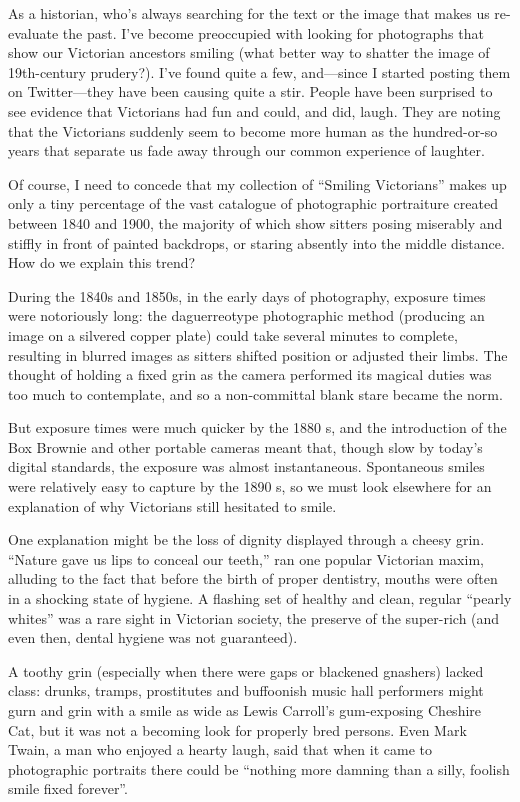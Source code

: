 As a historian, who's always searching for the text or the image that
makes us re-evaluate the past. I've become preoccupied with looking for
photographs that show our Victorian ancestors smiling (what better way
to shatter the image of 19th-century prudery?). I've found quite a few,
and---since I started posting them on Twitter---they have been causing
quite a stir. People have been surprised to see evidence that Victorians
had fun and could, and did, laugh. They are noting that the Victorians
suddenly seem to become more human as the hundred-or-so years that
separate us fade away through our common experience of laughter.

Of course, I need to concede that my collection of ``Smiling
Victorians'' makes up only a tiny percentage of the vast catalogue of
photographic portraiture created between 1840 and 1900, the majority of
which show sitters posing miserably and stiffly in front of painted
backdrops, or staring absently into the middle distance. How do we
explain this trend?

During the 1840s and 1850s, in the early days of photography, exposure
times were notoriously long: the daguerreotype photographic method
(producing an image on a silvered copper plate) could take several
minutes to complete, resulting in blurred images as sitters shifted
position or adjusted their limbs. The thought of holding a fixed grin as
the camera performed its magical duties was too much to contemplate, and
so a non-committal blank stare became the norm.

But exposure times were much quicker by the 1880 s, and the introduction
of the Box Brownie and other portable cameras meant that, though slow by
today's digital standards, the exposure was almost instantaneous.
Spontaneous smiles were relatively easy to capture by the 1890 s, so we
must look elsewhere for an explanation of why Victorians still hesitated
to smile.

One explanation might be the loss of dignity displayed through a cheesy
grin. ``Nature gave us lips to conceal our teeth,'' ran one popular
Victorian maxim, alluding to the fact that before the birth of proper
dentistry, mouths were often in a shocking state of hygiene. A flashing
set of healthy and clean, regular ``pearly whites'' was a rare sight in
Victorian society, the preserve of the super-rich (and even then, dental
hygiene was not guaranteed).

A toothy grin (especially when there were gaps or blackened gnashers)
lacked class: drunks, tramps, prostitutes and buffoonish music hall
performers might gurn and grin with a smile as wide as Lewis Carroll's
gum-exposing Cheshire Cat, but it was not a becoming look for properly
bred persons. Even Mark Twain, a man who enjoyed a hearty laugh, said
that when it came to photographic portraits there could be ``nothing
more damning than a silly, foolish smile fixed forever''.


